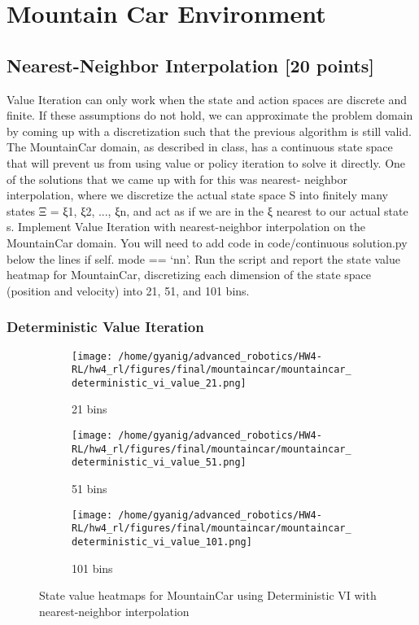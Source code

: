 \documentclass{article}
\newcommand{\points}[1]{{\textbf{[#1 points]}}}
\begin{document}
\newpage

\section{Mountain Car Environment}

\subsection{Nearest-Neighbor Interpolation \points{20}}

Value Iteration can only work when the state and action spaces are discrete and finite. If
these assumptions do not hold, we can approximate the problem domain by coming up with
a discretization such that the previous algorithm is still valid. The MountainCar domain, as
described in class, has a continuous state space that will prevent us from using value or policy
iteration to solve it directly. One of the solutions that we came up with for this was nearest-
neighbor interpolation, where we discretize the actual state space S into finitely many states
Ξ = ξ1, ξ2, ..., ξn, and act as if we are in the ξ nearest to our actual state s.
Implement Value Iteration with nearest-neighbor interpolation on the MountainCar domain.
You will need to add code in code/continuous solution.py below the lines if self. mode == ‘nn’.
Run the script and report the state value heatmap for MountainCar, discretizing each dimension
of the state space (position and velocity) into 21, 51, and 101 bins.
\subsubsection{Deterministic Value Iteration}
\begin{figure}[H]
    \centering
    \begin{subfigure}{0.32\textwidth}
        \texttt{[image: /home/gyanig/advanced\_robotics/HW4-RL/hw4\_rl/figures/final/mountaincar/mountaincar\_deterministic\_vi\_value\_21.png]}
        \caption{21 bins}
    \end{subfigure}
    \begin{subfigure}{0.32\textwidth}
        \texttt{[image: /home/gyanig/advanced\_robotics/HW4-RL/hw4\_rl/figures/final/mountaincar/mountaincar\_deterministic\_vi\_value\_51.png]}
        \caption{51 bins}
    \end{subfigure}
    \begin{subfigure}{0.32\textwidth}
        \texttt{[image: /home/gyanig/advanced\_robotics/HW4-RL/hw4\_rl/figures/final/mountaincar/mountaincar\_deterministic\_vi\_value\_101.png]}
        \caption{101 bins}
    \end{subfigure}
    \caption{State value heatmaps for MountainCar using Deterministic VI with nearest-neighbor interpolation}
\end{figure}
\end{document}
